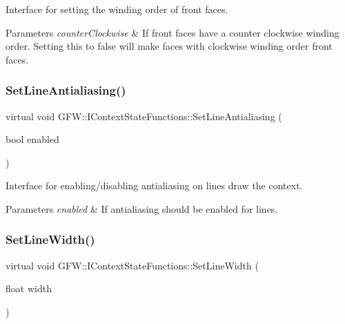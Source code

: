 Interface for setting the winding order of front faces. 


\begin{DoxyParams}{Parameters}
{\em counter\+Clockwise} & If front faces have a counter clockwise winding order. Setting this to false will make faces with clockwise winding order front faces. \\
\hline
\end{DoxyParams}
\mbox{\label{class_g_f_w_1_1_i_context_state_functions_add655f339107b203288d74e814ae9827}} 
\subsubsection{\texorpdfstring{Set\+Line\+Antialiasing()}{SetLineAntialiasing()}}
{\footnotesize\ttfamily virtual void G\+F\+W\+::\+I\+Context\+State\+Functions\+::\+Set\+Line\+Antialiasing (\begin{DoxyParamCaption}\item[{bool}]{enabled }\end{DoxyParamCaption})\hspace{0.3cm}{\ttfamily [pure virtual]}}



Interface for enabling/disabling antialiasing on lines draw the context. 


\begin{DoxyParams}{Parameters}
{\em enabled} & If antialiasing should be enabled for lines. \\
\hline
\end{DoxyParams}
\mbox{\label{class_g_f_w_1_1_i_context_state_functions_af8e56351f681e1c3e82be854a650d2a0}} 
\subsubsection{\texorpdfstring{Set\+Line\+Width()}{SetLineWidth()}}
{\footnotesize\ttfamily virtual void G\+F\+W\+::\+I\+Context\+State\+Functions\+::\+Set\+Line\+Width (\begin{DoxyParamCaption}\item[{float}]{width }\end{DoxyParamCaption})\hspace{0.3cm}{\ttfamily [pure virtual]}}



